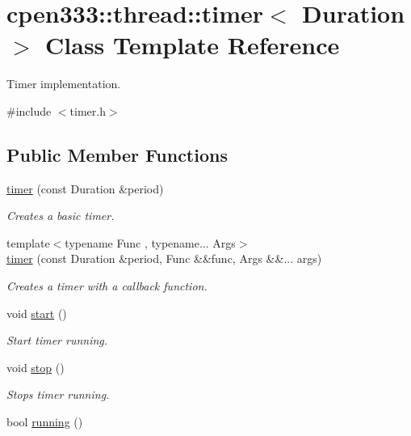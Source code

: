 \hypertarget{classcpen333_1_1thread_1_1timer}{}\section{cpen333\+:\+:thread\+:\+:timer$<$ Duration $>$ Class Template Reference}
\label{classcpen333_1_1thread_1_1timer}


Timer implementation.  




{\ttfamily \#include $<$timer.\+h$>$}

\subsection*{Public Member Functions}
\begin{DoxyCompactItemize}
\item 
\hyperlink{classcpen333_1_1thread_1_1timer_adf189ddfc276e7efa2c49ac9413627b9}{timer} (const Duration \&period)
\begin{DoxyCompactList}\small\item\em Creates a basic timer. \end{DoxyCompactList}\item 
{\footnotesize template$<$typename Func , typename... Args$>$ }\\\hyperlink{classcpen333_1_1thread_1_1timer_a850ad7eb401f54c5dc53ec0b01765135}{timer} (const Duration \&period, Func \&\&func, Args \&\&... args)
\begin{DoxyCompactList}\small\item\em Creates a timer with a callback function. \end{DoxyCompactList}\item 
void \hyperlink{classcpen333_1_1thread_1_1timer_a0d1be90402f46912966ec5fc13707bce}{start} ()
\begin{DoxyCompactList}\small\item\em Start timer running. \end{DoxyCompactList}\item 
void \hyperlink{classcpen333_1_1thread_1_1timer_afa3811e04ef58d3040935c49aca19948}{stop} ()
\begin{DoxyCompactList}\small\item\em Stops timer running. \end{DoxyCompactList}\item 
bool \hyperlink{classcpen333_1_1thread_1_1timer_a339ef2ea452a86d83a0f41c7d4e255b0}{running} ()

\end{DoxyCompactItemize}

